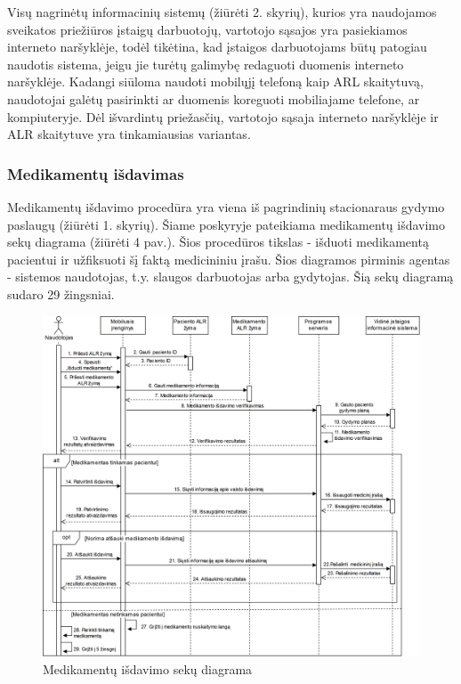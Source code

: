 Visų nagrinėtų informacinių sistemų (žiūrėti 2. skyrių), kurios yra naudojamos sveikatos priežiūros įstaigų darbuotojų, vartotojo sąsajos yra pasiekiamos interneto naršyklėje, todėl tikėtina, kad įstaigos darbuotojams būtų patogiau naudotis sistema, jeigu jie turėtų galimybę redaguoti duomenis interneto naršyklėje. Kadangi siūloma naudoti mobilųjį telefoną kaip ARL skaitytuvą, naudotojai galėtų pasirinkti ar duomenis koreguoti mobiliajame telefone, ar kompiuteryje. Dėl išvardintų priežasčių, vartotojo sąsaja interneto naršyklėje ir ALR skaitytuve yra tinkamiausias variantas.

\subsubsection{Medikamentų išdavimas}
Medikamentų išdavimo procedūra yra viena iš pagrindinių stacionaraus gydymo paslaugų (žiūrėti 1. skyrių). Šiame poskyryje pateikiama medikamentų išdavimo sekų diagrama (žiūrėti 4 pav.). Šios procedūros tikslas - išduoti medikamentą pacientui ir užfiksuoti šį faktą medicininiu įrašu. Šios diagramos pirminis agentas - sistemos naudotojas, t.y. slaugos darbuotojas arba gydytojas. Šią sekų diagramą sudaro 29 žingsniai.

\begin{figure}[H]
    \centering
    \includegraphics[scale=0.27]{images/israsytiVaistai}
    \caption{Medikamentų išdavimo sekų diagrama} 
\end{figure}

